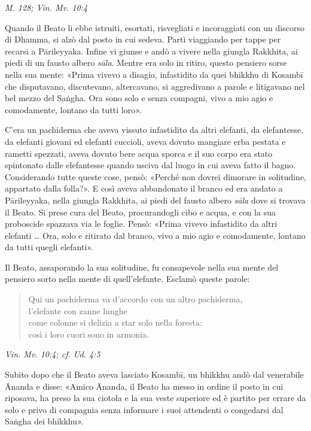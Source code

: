 \emph{M. 128; Vin. Mv. 10:4}


 Quando il Beato li ebbe istruiti, esortati, risvegliati e
incoraggiati con un discorso di Dhamma, si alzò dal posto in cui sedeva.
Partì viaggiando per tappe per recarsi a Pārileyyaka. Infine vi giunse e
andò a vivere nella giungla Rakkhita, ai piedi di un fausto albero
\emph{sāla}. Mentre era solo in ritiro, questo pensiero sorse nella sua
mente: «Prima vivevo a disagio, infastidito da quei bhikkhu di Kosambī
che disputavano, discutevano, altercavano, si aggredivano a parole e
litigavano nel bel mezzo del Saṅgha. Ora sono solo e senza compagni,
vivo a mio agio e comodamente, lontano da tutti loro».


C’era un pachiderma che aveva vissuto infastidito da altri elefanti, da
elefantesse, da elefanti giovani ed elefanti cuccioli, aveva dovuto
mangiare erba pestata e rametti spezzati, aveva dovuto bere acqua sporca
e il suo corpo era stato spintonato dalle elefantesse quando usciva dal
luogo in cui aveva fatto il bagno. Considerando tutte queste cose,
pensò: «Perché non dovrei dimorare in solitudine, appartato dalla
folla?». E così aveva abbandonato il branco ed era andato a Pārileyyaka,
nella giungla Rakkhita, ai piedi del fausto albero \emph{sāla} dove si
trovava il Beato. Si prese cura del Beato, procurandogli cibo e acqua, e
con la sua proboscide spazzava via le foglie. Pensò: «Prima vivevo
infastidito da altri elefanti … Ora, solo e ritirato dal branco, vivo a
mio agio e comodamente, lontano da tutti quegli elefanti».


Il Beato, assaporando la sua solitudine, fu consapevole nella sua mente
del pensiero sorto nella mente di quell’elefante. Esclamò queste parole:


\begin{quote}
Qui un pachiderma va d’accordo con un altro pachiderma, \\
l’elefante con zanne lunghe \\
come colonne si delizia a star solo nella foresta: \\
così i loro cuori sono in armonia.
\end{quote}

\emph{Vin. Mv. 10:4; cf. Ud. 4:5}


 Subito dopo che il Beato aveva lasciato Kosambī, un bhikkhu
andò dal venerabile Ānanda e disse: «Amico Ānanda, il Beato ha messo in
ordine il posto in cui riposava, ha preso la sua ciotola e la sua veste
superiore ed è partito per errare da solo e privo di compagnia senza
informare i suoi attendenti o congedarsi dal Saṅgha dei bhikkhu».


